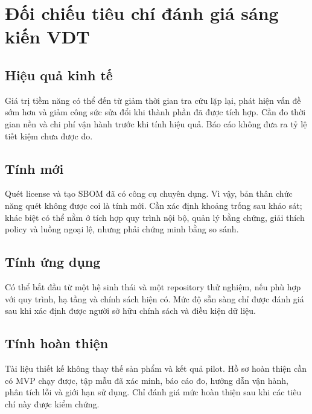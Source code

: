 \section{Đối chiếu tiêu chí đánh giá sáng kiến VDT}
\subsection{Hiệu quả kinh tế}
Giá trị tiềm năng có thể đến từ giảm thời gian tra cứu lặp lại, phát hiện vấn đề sớm hơn và giảm công sức sửa đổi khi thành phần đã được tích hợp. Cần đo thời gian nền và chi phí vận hành trước khi tính hiệu quả. Báo cáo không đưa ra tỷ lệ tiết kiệm chưa được đo.

\subsection{Tính mới}
Quét license và tạo SBOM đã có công cụ chuyên dụng. Vì vậy, bản thân chức năng quét không được coi là tính mới. Cần xác định khoảng trống sau khảo sát; khác biệt có thể nằm ở tích hợp quy trình nội bộ, quản lý bằng chứng, giải thích policy và luồng ngoại lệ, nhưng phải chứng minh bằng so sánh.

\subsection{Tính ứng dụng}
Có thể bắt đầu từ một hệ sinh thái và một repository thử nghiệm, nếu phù hợp với quy trình, hạ tầng và chính sách hiện có. Mức độ sẵn sàng chỉ được đánh giá sau khi xác định được người sở hữu chính sách và điều kiện dữ liệu.

\subsection{Tính hoàn thiện}
Tài liệu thiết kế không thay thế sản phẩm và kết quả pilot. Hồ sơ hoàn thiện cần có MVP chạy được, tập mẫu đã xác minh, báo cáo đo, hướng dẫn vận hành, phân tích lỗi và giới hạn sử dụng. Chỉ đánh giá mức hoàn thiện sau khi các tiêu chí này được kiểm chứng.

